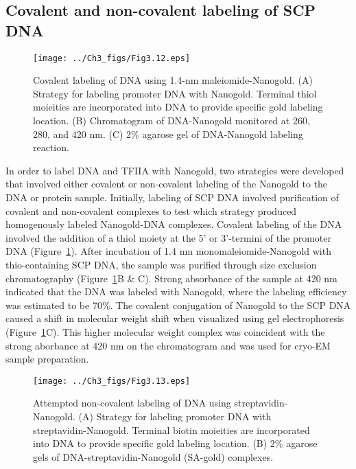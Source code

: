 \subsection{Covalent and non-covalent labeling of SCP DNA}
\begin{figure}
\centering
\texttt{[image: ../Ch3\_figs/Fig3.12.eps]}
\caption[Covalent labeling of DNA using 1.4-nm maleiomide-Nanogold]{Covalent labeling of DNA using 1.4-nm maleiomide-Nanogold. (A) Strategy for labeling promoter DNA with Nanogold. Terminal thiol moieities are incorporated into DNA to provide specific gold labeling location. (B) Chromatogram of DNA-Nanogold monitored at 260, 280, and 420 nm. (C) 2\% agarose gel of DNA-Nanogold labeling reaction.}
\label{fig:Fig3.12}
\end{figure}
In order to label DNA and TFIIA with Nanogold, two strategies were developed that involved either covalent or non-covalent labeling of the Nanogold to the DNA or protein sample. Initially, labeling of SCP DNA involved purification of covalent and non-covalent complexes to test which strategy produced homogenously labeled Nanogold-DNA complexes. Covalent labeling of the DNA involved the addition of a thiol moiety at the 5' or 3'-termini of the promoter DNA (Figure~\ref{fig:Fig3.12}). After incubation of 1.4 nm monomaleiomide-Nanogold with thio-containing SCP DNA, the sample was purified through size exclusion chromatography (Figure~\ref{fig:Fig3.12}B \& C). Strong absorbance of the sample at 420 nm indicated that the DNA was labeled with Nanogold, where the labeling efficiency was estimated to be 70\%. The covalent conjugation of Nanogold to the SCP DNA caused a shift in molecular weight shift when visualized using gel electrophoresis (Figure~\ref{fig:Fig3.12}C). This higher molecular weight complex was coincident with the strong aborbance at 420 nm on the chromatogram and was used for cryo-EM sample preparation.\\
\begin{figure}
\centering
\texttt{[image: ../Ch3\_figs/Fig3.13.eps]}
\caption[Attempted non-covalent labeling of DNA using streptavidin-Nanogold]{Attempted non-covalent labeling of DNA using streptavidin-Nanogold. (A) Strategy for labeling promoter DNA with streptavidin-Nanogold. Terminal biotin moieities are incorporated into DNA to provide specific gold labeling location. (B) 2\% agarose gels of DNA-streptavidin-Nanogold (SA-gold) complexes. }
\label{fig:Fig3.13}
\end{figure}
